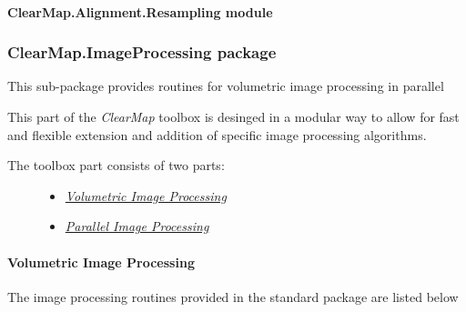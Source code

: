 \documentclass[letterpaper,10pt,english]{sphinxmanual}
\begin{document}
\paragraph{ClearMap.Alignment.Resampling module}
\label{api/ClearMap.Alignment:clearmap-alignment-resampling-module}

\subsubsection{ClearMap.ImageProcessing package}
\label{api/ClearMap.ImageProcessing:clearmap-imageprocessing-package}\label{api/ClearMap.ImageProcessing::doc}\label{api/ClearMap.ImageProcessing:module-ClearMap.ImageProcessing}
This sub-package provides routines for volumetric image processing in parallel

This part of the \emph{ClearMap} toolbox is desinged in a modular way to allow for
fast and flexible extension and addition of specific image processing
algorithms.
\begin{description}
\item[{The toolbox part consists of two parts:}] \leavevmode\begin{itemize}
\item {} 
{\hyperref[api/ClearMap.ImageProcessing:volumetric-image-processing]{\emph{Volumetric Image Processing}}}

\item {} 
{\hyperref[api/ClearMap.ImageProcessing:parallel-image-processing]{\emph{Parallel Image Processing}}}

\end{itemize}

\end{description}


\paragraph{Volumetric Image Processing}
\label{api/ClearMap.ImageProcessing:volumetric-image-processing}
The image processing routines provided in the standard package are listed below
\end{document}
